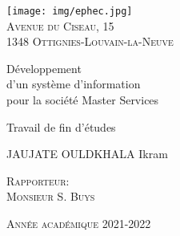 \documentclass[french, 11pt, a4paper]{article}
\begin{document}
\singlespacing


\begin{titlepage}
\begin{center}

\texttt{[image: img/ephec.jpg]}~\\
\textsc{Avenue du Ciseau, 15 \\ 1348 Ottignies-Louvain-la-Neuve} \\[1.5cm]

{\huge \bfseries \begin{spacing}{1.25}
  Développement \\ 
  d’un système d’information \\
  pour la société Master Services 
  \\[2cm]
  \end{spacing} 
} 

{\large 
  Travail de fin d'études
  \\[2cm]
}

{\LARGE 
JAUJATE OULDKHALA Ikram
}

\vspace*{\fill}
  
\end{center}

\begin{minipage}[t]{.5\textwidth}
  \textsc{\large Rapporteur:\\Monsieur S. Buys}
\end{minipage}
\begin{minipage}[br]{.5\textwidth}
  \textsc{\large Année académique 2021-2022}
\end{minipage}  

\end{titlepage}



\singlespacing
\newpage
{}
\renewcommand{\contentsname}{Table des matières}
\tableofcontents
\onehalfspacing

\newpage


\newpage


\newpage


\newpage


\newpage


\newpage


\newpage


\newpage


\newpage


\newpage


\newpage

\end{document}
